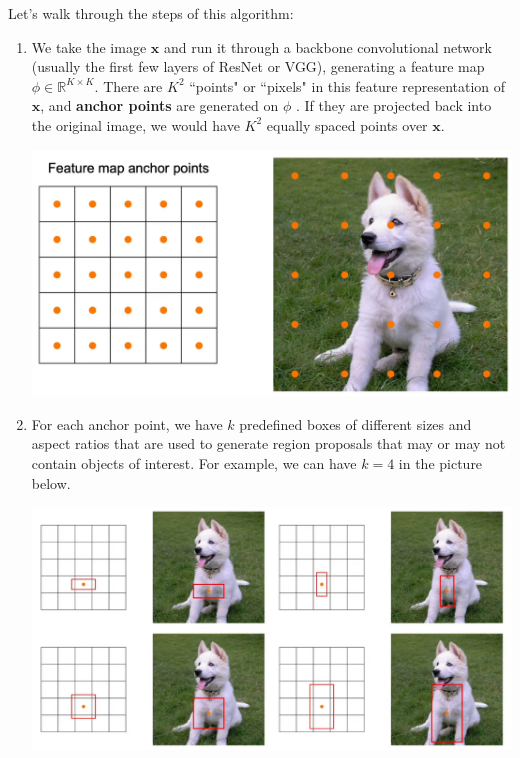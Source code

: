 \documentclass{article}
\theoremstyle{definition}
\theoremstyle{remark}
\theoremstyle{definition}
\begin{document}
      Let's walk through the steps of this algorithm: 
      \begin{enumerate}
          \item We take the image $\mathbf{x}$ and run it through a backbone convolutional network (usually the first few layers of ResNet or VGG), generating a feature map $\phi \in \mathbb{R}^{K \times K}$. There are $K^2$ ``points" or ``pixels" in this feature representation of $\mathbf{x}$, and \textbf{anchor points} are generated on $\phi$ . If they are projected back into the original image, we would have $K^2$ equally spaced points over $\mathbf{x}$. 
              \begin{center}
                  \includegraphics[scale=0.2]{img/anchor_points.png}
              \end{center}
          \item For each anchor point, we have $k$ predefined boxes of different sizes and aspect ratios that are used to generate region proposals that may or may not contain objects of interest. For example, we can have $k = 4$ in the picture below. 
          \begin{center}
              \includegraphics[scale=0.2]{img/anchor_boxes.png}
          \end{center}

\end{enumerate}
\end{document}
